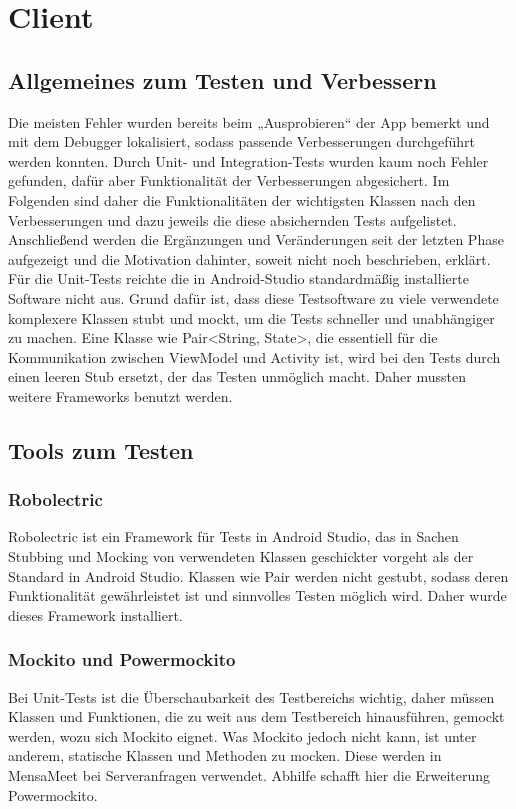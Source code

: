 \documentclass[a4paper]{scrreprt}
\begin{document}
\chapter{Client}

\section{Allgemeines zum Testen und Verbessern}

Die meisten Fehler wurden bereits beim „Ausprobieren“ der App bemerkt und mit dem Debugger lokalisiert, sodass passende Verbesserungen durchgeführt werden konnten. Durch Unit- und Integration-Tests wurden kaum noch Fehler gefunden, dafür aber Funktionalität der Verbesserungen abgesichert. Im Folgenden sind daher die Funktionalitäten der wichtigsten Klassen nach den Verbesserungen und dazu jeweils die diese absichernden Tests aufgelistet. Anschließend werden die Ergänzungen und Veränderungen seit der letzten Phase aufgezeigt und die Motivation dahinter, soweit nicht noch beschrieben, erklärt.
Für die Unit-Tests reichte die in Android-Studio standardmäßig installierte Software nicht aus. Grund dafür ist, dass diese Testsoftware zu viele verwendete komplexere Klassen stubt und mockt, um die Tests schneller und unabhängiger zu machen. Eine Klasse wie Pair<String, State>, die essentiell für die Kommunikation zwischen ViewModel und Activity ist, wird bei den Tests durch einen leeren Stub ersetzt, der das Testen unmöglich macht. Daher mussten weitere Frameworks benutzt werden.

\section{Tools zum Testen}

\subsection{Robolectric}
Robolectric ist ein Framework für Tests in Android Studio, das in Sachen Stubbing und Mocking von verwendeten Klassen geschickter vorgeht als der Standard in Android Studio. Klassen wie Pair werden nicht gestubt, sodass deren Funktionalität gewährleistet ist und sinnvolles Testen möglich wird. Daher wurde dieses Framework installiert.

\subsection{Mockito und Powermockito}
Bei Unit-Tests ist die Überschaubarkeit des Testbereichs wichtig, daher müssen Klassen und Funktionen, die zu weit aus dem Testbereich hinausführen, gemockt werden, wozu sich Mockito eignet. Was Mockito jedoch nicht kann, ist unter anderem, statische Klassen und Methoden zu mocken. Diese werden in MensaMeet bei Serveranfragen verwendet. Abhilfe schafft hier die Erweiterung Powermockito.
\end{document}
